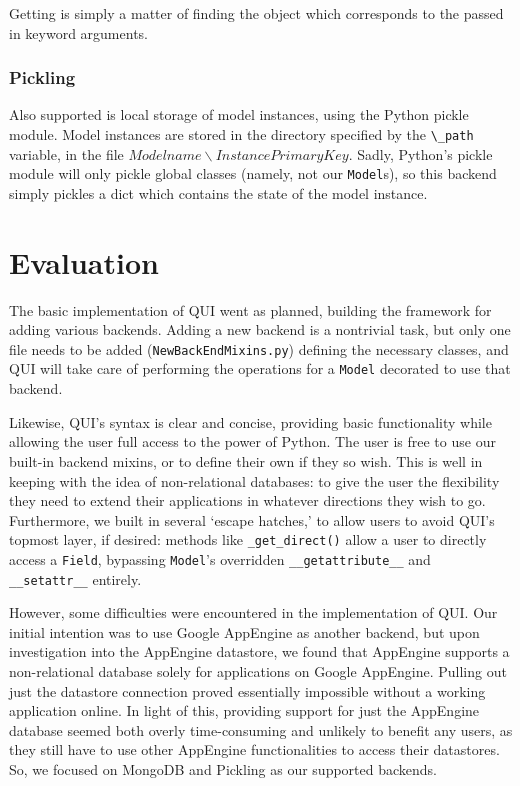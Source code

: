 \documentclass{article} %
\newcommand{\il}[1]{\mbox{\lstinline{#1}}}
\begin{document}
	Getting is simply a matter of finding the object which corresponds to the passed in keyword arguments.
	
\subsubsection{Pickling}
	Also supported is local storage of model instances, using the Python pickle module. Model instances are stored in the directory specified by the \il{\_path} variable, in
	the file $Modelname\backslash InstancePrimaryKey$. Sadly, Python's pickle module will only pickle global classes (namely, not our \il{Model}s), so this backend simply pickles a dict
	which contains the state of the model instance.

	
		
			
\newpage	
\section{Evaluation}
The basic implementation of QUI went as planned, building the framework for adding various backends. Adding a new backend is a nontrivial task, but only one file needs to be added
(\il{NewBackEndMixins.py}) defining the necessary classes, and QUI will take care of performing the operations for a \il{Model} decorated to use that backend.

Likewise, QUI's syntax is clear and concise, providing basic functionality while allowing the user full access to the power of Python. The user is free to use our built-in backend mixins, or 
to define their own if they so wish. This is well in keeping with the idea of non-relational databases: to give the user the flexibility they need to extend their applications in whatever
directions they wish to go. Furthermore, we built in several `escape hatches,' to allow users to avoid QUI's topmost layer, if desired: methods like \il{_get_direct()} allow a user to
directly access a \il{Field}, bypassing \il{Model}'s overridden \il{__getattribute__} and \il{__setattr__} entirely.

However, some difficulties were encountered in the implementation of QUI. Our initial intention was to use Google AppEngine as another backend, but upon investigation into the AppEngine
datastore, we found that AppEngine supports a non-relational database solely for applications on Google AppEngine. Pulling out just the datastore connection proved essentially impossible 
without a working application online. In light of this, providing support for just the AppEngine database seemed both overly time-consuming and unlikely to benefit any users, as they
still have to use other AppEngine functionalities to access their datastores. So, we focused on MongoDB and Pickling as our supported backends.
\end{document}
